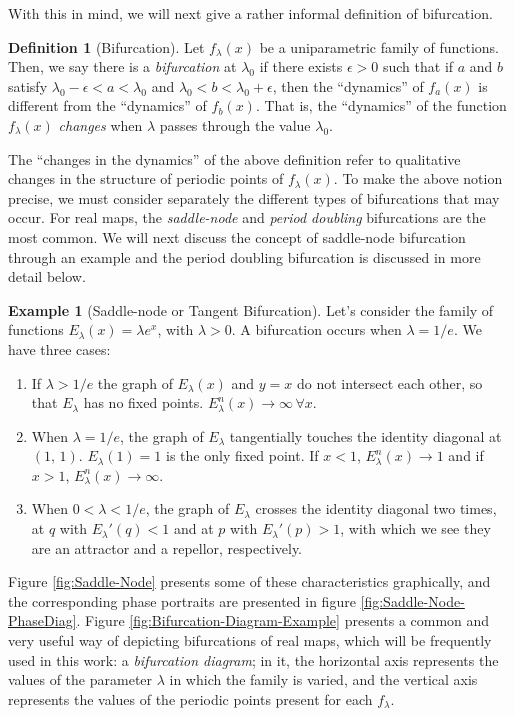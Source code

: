 \documentclass[10pt,twoside,titlepage]{book}
\numberwithin{equation}{chapter}
\numberwithin{figure}{chapter}
\numberwithin{table}{chapter}
\theoremstyle{plain}%
\theoremstyle{definition}
\newtheorem{defn}{Definition}[chapter]
\newtheorem{example}{Example}[chapter]
\theoremstyle{remark}
\begin{document}
With this in mind, we will next give a rather informal definition of bifurcation.

\begin{defn}[Bifurcation]
	Let $f_{\lambda}(x)$ be a uniparametric family of functions. Then, we say there is a \emph{bifurcation} at $\lambda_{0}$ if there exists $\epsilon>0$ such that if $a$ and $b$ satisfy $\lambda_{0}-\epsilon<a<\lambda_{0}$ and $\lambda_{0}<b<\lambda_{0}+\epsilon$, then the ``dynamics'' of $f_{a}(x)$ is different from the ``dynamics'' of $f_{b}(x)$. That is, the ``dynamics'' of the function $f_{\lambda} (x)$ \emph{changes} when $\lambda$ passes through the value $\lambda_{0}$.
\end{defn}

The ``changes in the dynamics'' of the above definition refer to qualitative changes in the structure of periodic points of $f_{\lambda}(x)$. To make the above notion precise, we must consider separately the different types of bifurcations that may occur. For real maps, the \emph{saddle-node} and \emph{period doubling} bifurcations are the most common. We will next discuss the concept of saddle-node bifurcation through an example and the period doubling bifurcation is discussed in more detail below.

\begin{example}[Saddle-node or Tangent Bifurcation]
	Let's consider the family of functions $E_{\lambda}(x)=\lambda e^{x}$, with $\lambda>0$. A bifurcation occurs when $\lambda=1/e$. We have three cases:
	\begin{enumerate}
		\item If $\lambda>1/e$ the graph of $E_{\lambda}(x)$ and $y=x$ do not intersect each other, so that $E_{\lambda}$ has no fixed points. $E_{\lambda}^{n}(x)\rightarrow\infty\,\forall x$.
		\item When $\lambda=1/e$, the graph of $E_{\lambda}$ tangentially touches the identity diagonal at $(1,\,1)$. $E_{\lambda}(1)=1$ is the only fixed point. If $x<1$, $E_{\lambda}^{n}(x)\rightarrow1$ and if $x>1$, $E_{\lambda}^{n}(x)\rightarrow\infty$.
		\item When $0<\lambda<1/e$, the graph of $E_{\lambda}$ crosses the identity diagonal two times, at $q$ with $E_{\lambda}'(q)<1$ and at $p$ with $E_{\lambda}'(p)>1$, with which we see they are an attractor and a repellor, respectively.
	\end{enumerate}
	Figure \ref{fig:Saddle-Node} presents some of these characteristics graphically, and the corresponding phase portraits are presented in figure \ref{fig:Saddle-Node-PhaseDiag}. Figure \ref{fig:Bifurcation-Diagram-Example} presents a common and very useful way of depicting bifurcations of real maps, which will be frequently used in this work: a \emph{bifurcation diagram}; in it, the horizontal axis represents the values of the parameter $\lambda$ in which the family is varied, and the vertical axis represents the values of the periodic points present for each $f_{\lambda}$.
\end{example}
\end{document}
